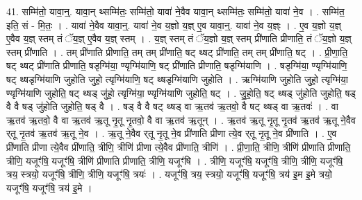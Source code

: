 \documentclass[17pt]{extarticle}
\begin{document}
41. सम्मि॑तो॒ यावा॒न्॒. यावा॒न् थ्सम्मि॑तः॒ सम्मि॑तो॒ यावा॑ ने॒वैव यावा॒न् थ्सम्मि॑तः॒ सम्मि॑तो॒ यावा॑ ने॒व । . सम्मि॑त॒ इति॒ सं - मि॒तः॒ । . यावा॑ ने॒वैव यावा॒न्॒. यावा॑ ने॒व य॒ज्ञो य॒ज्ञ् ए॒व यावा॒न्॒. यावा॑ ने॒व य॒ज्ञ्ः । . ए॒व य॒ज्ञो य॒ज्ञ् ए॒वैव य॒ज्ञ् स्तम् तं ॅय॒ज्ञ् ए॒वैव य॒ज्ञ् स्तम् । . य॒ज्ञ् स्तम् तं ॅय॒ज्ञो य॒ज्ञ् स्तम् प्री॑णाति प्रीणाति॒ तं ॅय॒ज्ञो य॒ज्ञ् स्तम् प्री॑णाति । . तम् प्री॑णाति प्रीणाति॒ तम् तम् प्री॑णाति॒ षट् थ्षट् प्री॑णाति॒ तम् तम् प्री॑णाति॒ षट् । . प्री॒णा॒ति॒ षट् थ्षट् प्री॑णाति प्रीणाति॒ षडृग्मि॑या॒ ण्यृग्मि॑याणि॒ षट् प्री॑णाति प्रीणाति॒ षडृग्मि॑याणि । . षडृग्मि॑या॒ ण्यृग्मि॑याणि॒ षट् थ्षडृग्मि॑याणि जुहोति जुहो॒ त्यृग्मि॑याणि॒ षट् थ्षडृग्मि॑याणि जुहोति । . ऋग्मि॑याणि जुहोति जुहो॒ त्यृग्मि॑या॒ ण्यृग्मि॑याणि जुहोति॒ षट् थ्षड् जु॑हो॒ त्यृग्मि॑या॒ ण्यृग्मि॑याणि जुहोति॒ षट् । . जु॒हो॒ति॒ षट् थ्षड् जु॑होति जुहोति॒ षड् वै वै षड् जु॑होति जुहोति॒ षड् वै । . षड् वै वै षट् थ्षड् वा ऋ॒तव॑ ऋ॒तवो॒ वै षट् थ्षड् वा ऋ॒तवः॑ । . वा ऋ॒तव॑ ऋ॒तवो॒ वै वा ऋ॒तव॑ ऋ॒तू नृ॒तू नृ॒तवो॒ वै वा ऋ॒तव॑ ऋ॒तून् । . ऋ॒तव॑ ऋ॒तू नृ॒तू नृ॒तव॑ ऋ॒तव॑ ऋ॒तू ने॒वैव र्‌तू नृ॒तव॑ ऋ॒तव॑ ऋ॒तू ने॒व । . ऋ॒तू ने॒वैव र्‌तू नृ॒तू ने॒व प्री॑णाति प्रीणा त्ये॒व र्‌तू नृ॒तू ने॒व प्री॑णाति । . ए॒व प्री॑णाति प्रीणा त्ये॒वैव प्री॑णाति॒ त्रीणि॒ त्रीणि॑ प्रीणा त्ये॒वैव प्री॑णाति॒ त्रीणि॑ । . प्री॒णा॒ति॒ त्रीणि॒ त्रीणि॑ प्रीणाति प्रीणाति॒ त्रीणि॒ यजूꣳ॑षि॒ यजूꣳ॑षि॒ त्रीणि॑ प्रीणाति प्रीणाति॒ त्रीणि॒ यजूꣳ॑षि । . त्रीणि॒ यजूꣳ॑षि॒ यजूꣳ॑षि॒ त्रीणि॒ त्रीणि॒ यजूꣳ॑षि॒ त्रय॒ स्त्रयो॒ यजूꣳ॑षि॒ त्रीणि॒ त्रीणि॒ यजूꣳ॑षि॒ त्रयः॑ । . यजूꣳ॑षि॒ त्रय॒ स्त्रयो॒ यजूꣳ॑षि॒ यजूꣳ॑षि॒ त्रय॑ इ॒म इ॒मे त्रयो॒ यजूꣳ॑षि॒ यजूꣳ॑षि॒ त्रय॑ इ॒मे । \newline
\pagebreak
{}
\end{document}
